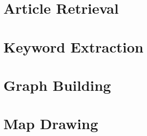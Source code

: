 \section{Article Retrieval}

\section{Keyword Extraction}

\section{Graph Building}

\section{Map Drawing}